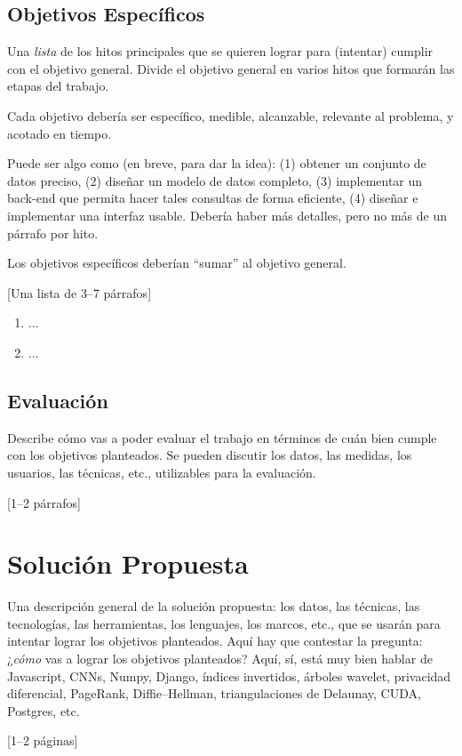\documentclass[guia]{upropuesta}
\begin{document}
  \subsection*{Objetivos Específicos}\label{sec:obj-e}
  
  \begin{pauta}
  Una \textit{lista} de los hitos principales que se quieren lograr para (intentar) cumplir con el objetivo general. Divide el objetivo general en varios hitos que formarán las etapas del trabajo.
  
  Cada objetivo debería ser específico, medible, alcanzable, relevante al problema, y acotado en tiempo.
  
  Puede ser algo como (en breve, para dar la idea): (1) obtener un conjunto de datos preciso, (2) diseñar un modelo de datos completo, (3) implementar un back-end que permita hacer tales consultas de forma eficiente, (4) diseñar e implementar una interfaz usable. Debería haber más detalles, pero no más de un párrafo por hito. 
  
  Los objetivos específicos deberían ``sumar'' al objetivo general.
  
  [Una lista de 3--7 párrafos]
  \end{pauta}
  
  \begin{enumerate}
    \item ...
    \item ...
  \end{enumerate}
  
  \subsection*{Evaluación}\label{sec:eval}
  
  \begin{pauta}
  Describe cómo vas a poder evaluar el trabajo en términos de cuán bien  cumple con los objetivos planteados. Se pueden discutir los datos, las medidas, los usuarios, las técnicas, etc., utilizables para la evaluación.
  
  [1--2 párrafos]
  \end{pauta}

\section{Solución Propuesta}\label{sec:sol}

\begin{pauta}
Una descripción general de la solución propuesta: los datos, las técnicas, las tecnologías, las herramientas, los lenguajes, los marcos, etc., que se usarán para intentar lograr los objetivos planteados. Aquí hay que contestar la pregunta: ¿\textit{cómo} vas a lograr los objetivos planteados? Aquí, sí, está muy bien hablar de Javascript, CNNs, Numpy, Django, índices invertidos, árboles wavelet, privacidad diferencial, PageRank, Diffie--Hellman, triangulaciones de Delaunay, CUDA, Postgres, etc.

[1--2 páginas]
\end{pauta}
\end{document}
